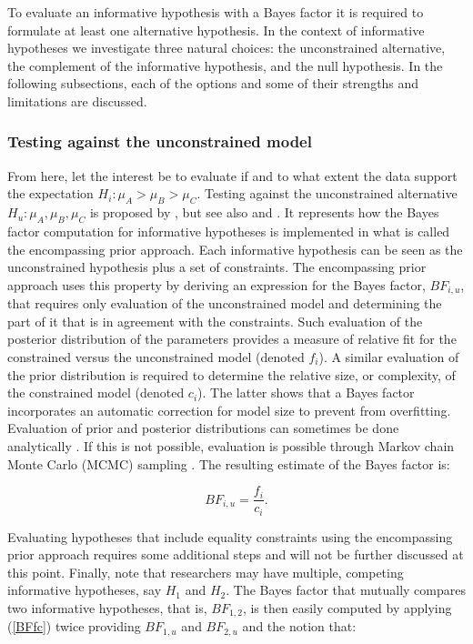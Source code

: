 \documentclass[11pt,reqno]{article}
\begin{document}
To evaluate an informative hypothesis with a Bayes factor it is required to formulate at least one alternative hypothesis. In the context of informative hypotheses we investigate three natural choices: the unconstrained alternative, the complement of the informative hypothesis, and the null hypothesis. In the following subsections, each of the options and some of their strengths and limitations are discussed.



\subsubsection{Testing against the unconstrained model}
From here, let the interest be to evaluate if and to what extent the data support the expectation $H_i: \mu_A > \mu_B > \mu_C$.
Testing against the unconstrained alternative $H_u: \mu_A, \mu_B, \mu_C$ is proposed by \textcite{klugkist_inequality_2005}, but see also \textcite{hoijtink_informative_2012} and \textcite{hoijtink_klugkist_boelen_2008}. It represents how the Bayes factor computation for informative hypotheses is implemented in what is called the encompassing prior approach. Each informative hypothesis can be seen as the unconstrained hypothesis plus a set of constraints. The encompassing prior approach uses this property by deriving an expression for the Bayes factor, $BF_{i,u}$, that requires only evaluation of the unconstrained model and determining the part of it that is in agreement with the constraints. Such evaluation of the posterior distribution of the parameters provides a measure of relative fit for the constrained versus the unconstrained model (denoted $f_i$). A similar evaluation of the prior distribution is required to determine the relative size, or complexity, of the constrained model (denoted $c_i$). The latter shows that a Bayes factor incorporates an automatic correction for model size to prevent from overfitting. Evaluation of prior and posterior distributions can sometimes be done analytically \autocite[e.g.,][]{mulder_gu_bayesian_2021}. If this is not possible, evaluation is possible through  Markov chain Monte Carlo (MCMC) sampling \autocite{gilks_markov_1995}. The resulting estimate of the Bayes factor is:

\begin{equation}\label{BFfc}
  BF_{i,u} = \frac{f_i}{c_i}.
\end{equation}

Evaluating hypotheses that include equality constraints using the encompassing prior approach requires some additional steps \autocite[see][]{klugkist_inequality_2005, vanwesel_choosing_2011, mulder_equality_2010} and will not be further discussed at this point. Finally, note that researchers may have multiple, competing informative hypotheses, say $H_{1}$ and $H_{2}$. The Bayes factor that mutually compares two informative hypotheses, that is, $BF_{1,2}$, is then easily computed by applying (\ref{BFfc}) twice providing $BF_{1,u}$ and $BF_{2,u}$ and the notion that:
\end{document}
